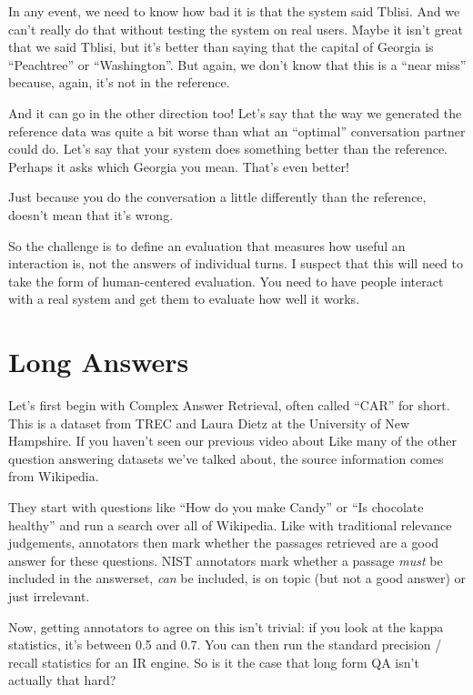 In any event, we need to know how bad it is that the system said Tblisi.  And we can’t really do that without testing the system on real users.  Maybe it isn’t great that we said Tblisi, but it’s better than saying that the capital of Georgia is “Peachtree” or “Washington”.  But again, we don’t know that this is a “near miss” because, again, it’s not in the reference.

And it can go in the other direction too!  Let’s say that the way we generated the reference data was quite a bit worse than what an “optimal” conversation partner could do.  Let’s say that your system does something better than the reference.  Perhaps it asks which Georgia you mean.  That’s even better!

Just because you do the conversation a little differently than the reference, doesn’t mean that it’s wrong.  

So the challenge is to define an evaluation that measures how useful an interaction is, not the answers of individual turns.  I suspect that this will need to take the form of human-centered evaluation.  You need to have people interact with a real system and get them to evaluate how well it works.

\section{Long Answers}
\label{sec:formats:long-answers}

Let’s first begin with Complex Answer Retrieval, often called “CAR” for short.  This is a dataset from TREC and Laura Dietz at the University of New Hampshire.  If you haven’t seen our previous video about Like many of the other question answering datasets we’ve talked about, the source information comes from Wikipedia.  

They start with questions like “How do you make Candy” or “Is chocolate healthy” and run a search over all of Wikipedia.  Like with traditional relevance judgements, annotators then mark whether the passages retrieved are a good answer for these questions.  NIST annotators mark whether a passage \emph{must} be included in the answerset, \emph{can} be included, is on topic (but not a good answer) or just irrelevant.

Now, getting annotators to agree on this isn’t trivial: if you look at the kappa statistics, it’s between 0.5 and 0.7.  You can then run the standard precision / recall statistics for an IR engine.  So is it the case that long form QA isn’t actually that hard?

